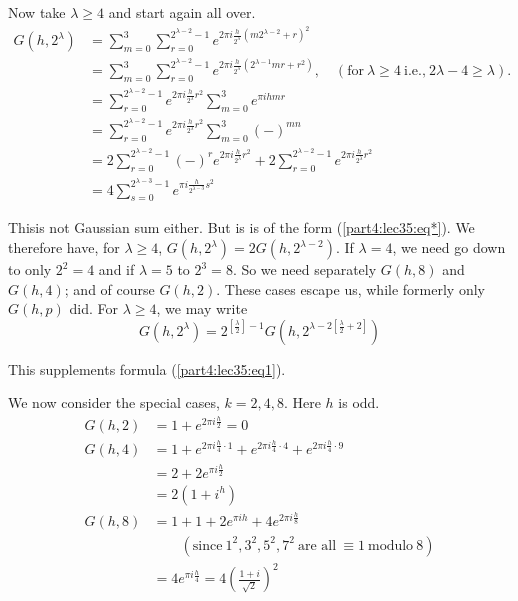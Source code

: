 Now take $\lambda \geq 4$ and start again all over.
\begin{align*}
  G(h, 2^\lambda)& = \sum^3_{m=0} \sum^{2^{\lambda-2}-1}_{r=0} e^{2
    \pi i \frac{h}{2^\lambda} (m 2^{\lambda-2}+r)^2}\\
  & = \sum^3_{m=0} \sum^{2^{\lambda-2}-1}_{r=0} e^{2 \pi i
    \frac{h}{2^\lambda}(2^{\lambda-1}m r+ r^2)}, \quad (\text{for}~
  \lambda \geq 4 ~\text{i.e.,}~ 2 \lambda   -4 \geq \lambda).\\
  & = \sum^{2^{\lambda-2}-1}_{r=0} e^{2 \pi i \frac{h}{2^\lambda} r^2}
    \sum^3_{m=0} e^{\pi i h m r}\\
  & = \sum^{2^{\lambda-2}-1}_{r=0} e^{2 \pi i \frac{h}{2^\lambda} r^2}
    \sum^3_{m=0} (-)^{mn}\\
  & = 2 \sum^{2^{\lambda-2}-1}_{r=0} (-)^r e^{2 \pi i
      \frac{h}{2^\lambda} r^2} + 2 \sum^{2^{\lambda-2}-1}_{r=0} e^{2
      \pi i \frac{h}{2^\lambda} r^2}\\
  & = 4 \sum^{2^{\lambda-3}-1}_{s=0} e^{\pi i \frac{h}{2^{\lambda-3}}s^2}
\end{align*}

This\pageoriginale is not Gaussian sum either. But is is of the form
(\ref{part4:lec35:eq*}). We therefore have, for $\lambda \geq 4$,
$G(h, 2^\lambda)= 2 G(h, 
2^{\lambda -2})$. If $\lambda=4$, we need go down to only $2^2 =4$ and
if $\lambda =5$ to $2^3=8$. So we need separately $G(h, 8)$ and $G(h,
4)$; and of course $G(h, 2)$. These cases escape us, while formerly
only $G(h, p)$ did. For $\lambda \geq 4$, we may write
\begin{equation*}
  G(h, 2^\lambda)= 2^{\left[\frac{\lambda}{2}\right]-1} G\left(h,
  2^{\lambda-2 \left[\frac{\lambda}{2}+2 \right]}\right) \tag{2}\label{part4:lec35:eq2}
\end{equation*}

This supplements formula (\ref{part4:lec35:eq1}).

We now consider the special cases, $k=2, 4,8$. Here $h$ is odd.
\begin{align*}
  G(h, 2) & = 1+ e^{2 \pi i \frac{h}{2}}=0\\
  G(h, 4) & = 1+ e^{2 \pi i \frac{h}{4}\cdot 1} + e^{2 \pi i
    \frac{h}{4} \cdot 4}+ e^{2 \pi i \frac{h}{4} \cdot 9}\\
  & = 2 + 2 e^{\pi i \frac{h}{2}}\\
  & = 2\left( 1+ i^h\right)\\
  G(h, 8) & = 1+ 1+ 2 e^{\pi i h} + 4 e^{2 \pi i \frac{h}{8}}\\
  & \qquad (\text{since}~ 1^2, 3^2, 5^2, 7^2 ~\text{are all}~ \equiv 1
 ~\text{modulo}~ 8)\\
  & = 4 e^{\pi i \frac{h}{4}}= 4\left(\frac{1+ i}{\surd 2} \right)^2
\end{align*}

